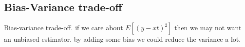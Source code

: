 
\subsection{Bias-Variance trade-off}

Bias-variance trade-off. if we care about \(E[(y-xt)^2]\) then we may not want an unbiased estimator. by adding some bias we could reduce the variance a lot.

